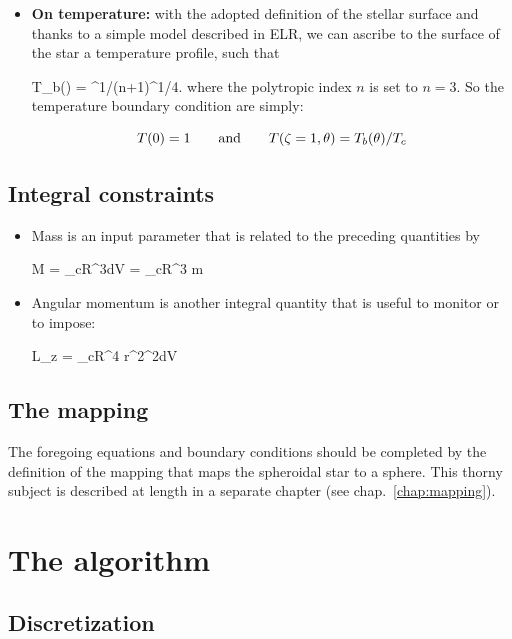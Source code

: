 \begin{itemize}
\item {\bf On temperature:} with the adopted definition of the stellar surface
and thanks to a simple model described in ELR, we can ascribe
to the surface of the star a temperature profile, such that

\beq T_b(\theta) = \lp{}\rp^{1/(n+1)}\lp{}\rp^{1/4}\;.
where the polytropic index $n$ is set to $n=3$. So the temperature
boundary condition are simply:

\[ T(0) = 1 \andet T(\zeta=1,\theta)=T_b(\theta)/T_c\]


\end{itemize}

\subsection{Integral constraints}

\begin{itemize}
\item Mass is an input parameter that is related to the preceding
quantities by

\beq M = \rho_cR^3\intvol \rho dV = \rho_cR^3 m

\item Angular momentum is another integral quantity that is useful to
monitor or to impose:

\beq L_z = \rho_cR^4
\intvol r^2\sin^2\theta\Omega\rho dV \eeq

\end{itemize}

\subsection{The mapping}

The foregoing equations and boundary conditions should be completed by
the definition of the mapping that maps the spheroidal star to a sphere.
This thorny subject is described at length in a separate chapter
(see chap.~\ref{chap:mapping}).

\section{The algorithm}

\subsection{Discretization}

